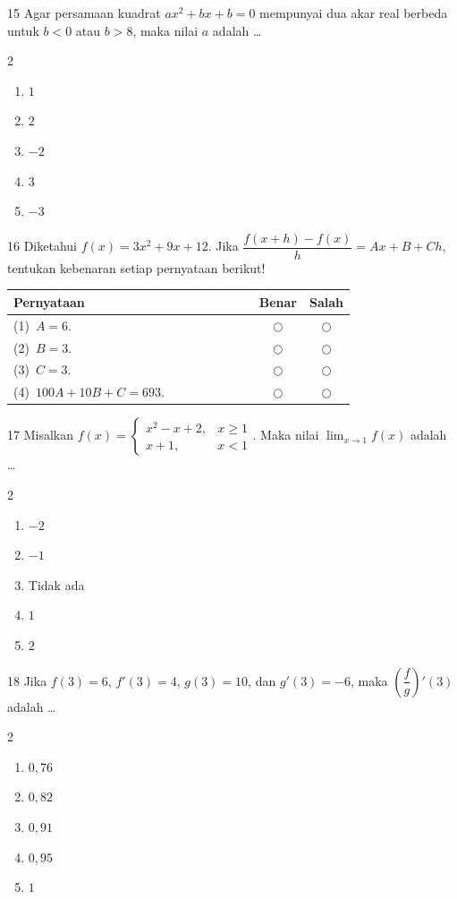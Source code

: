 \documentclass[11pt]{article}
\newenvironment{pilB}{%
  \par\smallskip\begin{multicols}{2}
  \begin{enumerate}[label=(\Alph*),leftmargin=*,itemsep=1pt,topsep=3pt]}%
  {\end{enumerate}\end{multicols}}
\begin{document}
\begin{soal}{15}
Agar persamaan kuadrat $ax^2+bx+b=0$ mempunyai dua akar real berbeda
untuk $b<0$ atau $b>8$, maka nilai $a$ adalah \ldots
\begin{pilB}
  \item $1$ \item $2$ \item $-2$ \item $3$ \item $-3$
\end{pilB}
\end{soal}

\begin{soal}{16}
Diketahui $f(x)=3x^2+9x+12$. Jika
$\dfrac{f(x+h)-f(x)}{h}=Ax+B+Ch$,
tentukan kebenaran setiap pernyataan berikut!

\par\smallskip
{\renewcommand{\arraystretch}{1.4}%
\begin{tabular}{@{}p{0.76\linewidth}cc@{}}
\hline
\textbf{Pernyataan} & \textbf{Benar} & \textbf{Salah}\\
\hline
(1)~$A = 6$.
  & $\bigcirc$ & $\bigcirc$\\
(2)~$B = 3$.
  & $\bigcirc$ & $\bigcirc$\\
(3)~$C = 3$.
  & $\bigcirc$ & $\bigcirc$\\
(4)~$100A+10B+C = 693$.
  & $\bigcirc$ & $\bigcirc$\\
\hline
\end{tabular}}
\end{soal}

\begin{soal}{17}
Misalkan $f(x)=\begin{cases}x^2-x+2, & x\geq1\\ x+1, & x<1\end{cases}$.
Maka nilai $\lim_{x\to1}f(x)$ adalah \ldots
\begin{pilB}
  \item $-2$ \item $-1$ \item Tidak ada \item $1$ \item $2$
\end{pilB}
\end{soal}

\begin{soal}{18}
Jika $f(3)=6$, $f'(3)=4$, $g(3)=10$, dan $g'(3)=-6$, maka
$\left(\dfrac{f}{g}\right)'(3)$ adalah \ldots
\begin{pilB}
  \item $0{,}76$ \item $0{,}82$ \item $0{,}91$ \item $0{,}95$ \item $1$
\end{pilB}
\end{soal}
\end{document}
